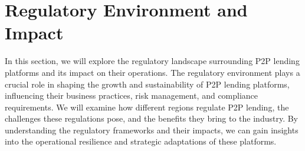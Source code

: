 \documentclass{article}
\begin{document}




\section{Regulatory Environment and Impact}
In this section, we will explore the regulatory landscape surrounding P2P lending platforms and its impact on their operations. The regulatory environment plays a crucial role in shaping the growth and sustainability of P2P lending platforms, influencing their business practices, risk management, and compliance requirements. We will examine how different regions regulate P2P lending, the challenges these regulations pose, and the benefits they bring to the industry. By understanding the regulatory frameworks and their impacts, we can gain insights into the operational resilience and strategic adaptations of these platforms.
\end{document}
